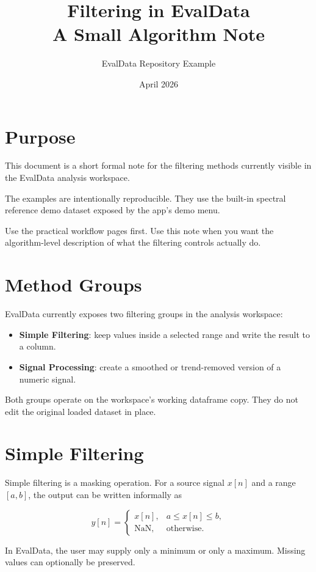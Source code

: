 \documentclass[11pt,a4paper]{article}
\title{Filtering in EvalData\\A Small Algorithm Note}
\author{EvalData Repository Example}
\date{April 2026}
\begin{document}
\maketitle

\section{Purpose}

This document is a short formal note for the filtering methods currently visible in the EvalData analysis workspace.

The examples are intentionally reproducible. They use the built-in spectral reference demo dataset exposed by the app's demo menu.

Use the practical workflow pages first. Use this note when you want the algorithm-level description of what the filtering controls actually do.

\section{Method Groups}

EvalData currently exposes two filtering groups in the analysis workspace:

\begin{itemize}
    \item \textbf{Simple Filtering}: keep values inside a selected range and write the result to a column.
    \item \textbf{Signal Processing}: create a smoothed or trend-removed version of a numeric signal.
\end{itemize}

Both groups operate on the workspace's working dataframe copy. They do not edit the original loaded dataset in place.

\section{Simple Filtering}

Simple filtering is a masking operation. For a source signal $x[n]$ and a range $[a,b]$, the output can be written informally as

\[
y[n] =
\begin{cases}
x[n], & a \le x[n] \le b, \\
\mathrm{NaN}, & \text{otherwise.}
\end{cases}
\]

In EvalData, the user may supply only a minimum or only a maximum. Missing values can optionally be preserved.
\end{document}
